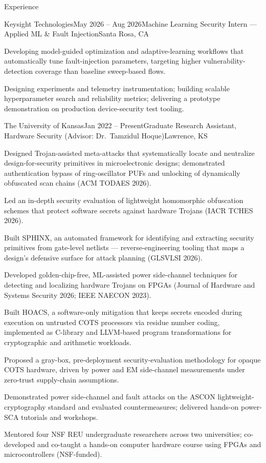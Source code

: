 \begin{rSection}{Experience}

\begin{rSubsection}{Keysight Technologies}{May 2026 -- Aug 2026}{Machine Learning Security Intern --- Applied ML \& Fault Injection}{Santa Rosa, CA}
\item Developing model-guided optimization and adaptive-learning workflows that automatically tune fault-injection parameters, targeting higher vulnerability-detection coverage than baseline sweep-based flows.
\item Designing experiments and telemetry instrumentation; building scalable hyperparameter search and reliability metrics; delivering a prototype demonstration on production device-security test tooling.
\end{rSubsection}

\begin{rSubsection}{The University of Kansas}{Jan 2022 -- Present}{Graduate Research Assistant, Hardware Security (Advisor: Dr.\ Tamzidul Hoque)}{Lawrence, KS}
\item Designed Trojan-assisted meta-attacks that systematically locate and neutralize design-for-security primitives in microelectronic designs; demonstrated authentication bypass of ring-oscillator PUFs and unlocking of dynamically obfuscated scan chains (ACM TODAES 2026).
\item Led an in-depth security evaluation of lightweight homomorphic obfuscation schemes that protect software secrets against hardware Trojans (IACR TCHES 2026).
\item Built SPHINX, an automated framework for identifying and extracting security primitives from gate-level netlists --- reverse-engineering tooling that maps a design's defensive surface for attack planning (GLSVLSI 2026).
\item Developed golden-chip-free, ML-assisted power side-channel techniques for detecting and localizing hardware Trojans on FPGAs (Journal of Hardware and Systems Security 2026; IEEE NAECON 2023).
\item Built HOACS, a software-only mitigation that keeps secrets encoded during execution on untrusted COTS processors via residue number coding, implemented as C-library and LLVM-based program transformations for cryptographic and arithmetic workloads.
\item Proposed a gray-box, pre-deployment security-evaluation methodology for opaque COTS hardware, driven by power and EM side-channel measurements under zero-trust supply-chain assumptions.
\item Demonstrated power side-channel and fault attacks on the ASCON lightweight-cryptography standard and evaluated countermeasures; delivered hands-on power-SCA tutorials and workshops.
\item Mentored four NSF REU undergraduate researchers across two universities; co-developed and co-taught a hands-on computer hardware course using FPGAs and microcontrollers (NSF-funded).
\end{rSubsection}

\end{rSection}
